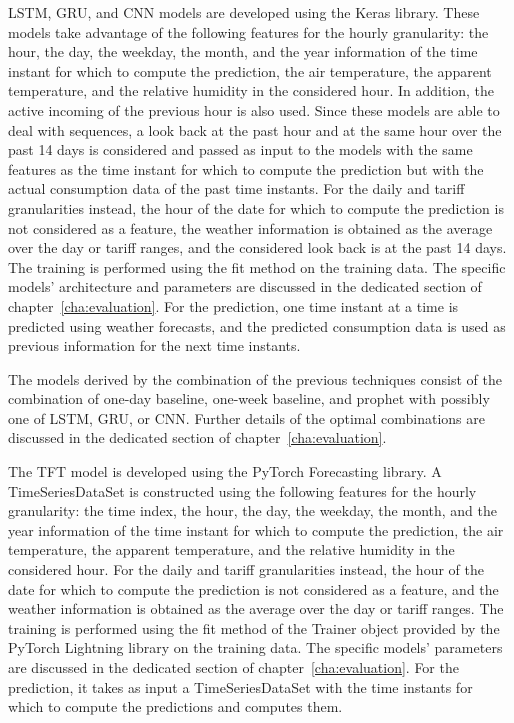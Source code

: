 LSTM, GRU, and CNN models are developed using the Keras library.
These models take advantage of the following features for the hourly granularity: the hour, the day, the weekday, the month, and the year information of the time instant for which to compute the prediction, the air temperature, the apparent temperature, and the relative humidity in the considered hour.
In addition, the active incoming of the previous hour is also used.
Since these models are able to deal with sequences, a look back at the past hour and at the same hour over the past 14 days is considered and passed as input to the models with the same features as the time instant for which to compute the prediction but with the actual consumption data of the past time instants.
For the daily and tariff granularities instead, the hour of the date for which to compute the prediction is not considered as a feature, the weather information is obtained as the average over the day or tariff ranges, and the considered look back is at the past 14 days.
The training is performed using the fit method on the training data.
The specific models’ architecture and parameters are discussed in the dedicated section of chapter~\ref{cha:evaluation}.
For the prediction, one time instant at a time is predicted using weather forecasts, and the predicted consumption data is used as previous information for the next time instants.

The models derived by the combination of the previous techniques consist of the combination of one-day baseline, one-week baseline, and prophet with possibly one of LSTM, GRU, or CNN.
Further details of the optimal combinations are discussed in the dedicated section of chapter~\ref{cha:evaluation}.

The TFT model is developed using the PyTorch Forecasting library.
A TimeSeriesDataSet is constructed using the following features for the hourly granularity: the time index, the hour, the day, the weekday, the month, and the year information of the time instant for which to compute the prediction, the air temperature, the apparent temperature, and the relative humidity in the considered hour.
For the daily and tariff granularities instead, the hour of the date for which to compute the prediction is not considered as a feature, and the weather information is obtained as the average over the day or tariff ranges.
The training is performed using the fit method of the Trainer object provided by the PyTorch Lightning library on the training data.
The specific models’ parameters are discussed in the dedicated section of chapter~\ref{cha:evaluation}.
For the prediction, it takes as input a TimeSeriesDataSet with the time instants for which to compute the predictions and computes them.

